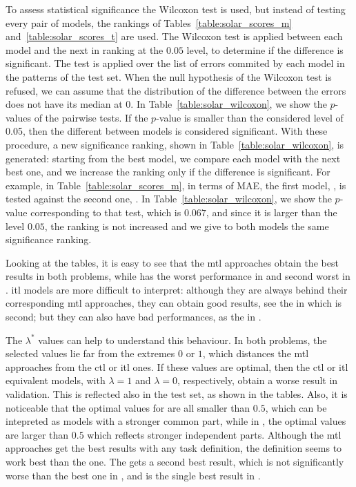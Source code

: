 To assess statistical significance the Wilcoxon test is used, but instead of testing every pair of models, the rankings of Tables~\ref{table:solar_scores_m} and~\ref{table:solar_scores_t} are used. The Wilcoxon test is applied between each model and the next in ranking at the $0.05$ level, to determine if the difference is significant.
The test is applied over the list of errors commited by each model in the patterns of the test set. When the null hypothesis of the Wilcoxon test is refused, we can assume that the distribution of the difference between the errors does not have its median at $0$.
In Table~\ref{table:solar_wilcoxon}, we show the $p$-values of the pairwise tests. If the $p$-value is smaller than the considered level of 0.05, then the different between models is considered significant.
%
With these procedure, a new significance ranking, shown in Table~\ref{table:solar_wilcoxon},  is generated: starting from the best model, we compare each model with the next best one, and we increase the ranking only if the difference is significant.
%
For example, in Table~\ref{table:solar_scores_m}, in terms of MAE, the first model, , is tested against the second one, . In Table~\ref{table:solar_wilcoxon}, we show the $p$-value corresponding to that test, which is $0.067$, and since it is larger than the level $0.05$, the ranking is not increased and we give to both models the same significance ranking. 

%
Looking at the tables, it is easy to see that the \acrshort{mtl} approaches obtain the best results in both problems, while  has the worst performance in  and second worst in .
\acrshort{itl} models are more difficult to interpret: although they are always behind their corresponding \acrshort{mtl} approaches, they can obtain good results, see the  in  which is second; but they can also have bad performances, as the  in .

%
The $\lambda^*$ values can help to understand this behaviour. In both problems, the selected values lie far from the extremes $0$ or $1$, which distances the \acrshort{mtl} approaches from the \acrshort{ctl} or \acrshort{itl} ones. If these values are optimal, then the \acrshort{ctl} or \acrshort{itl} equivalent models, with $\lambda=1$ and $\lambda=0$, respectively, obtain a worse result in validation. This is reflected also in the test set, as shown in the tables.
Also, it is noticeable that the optimal values for  are all smaller than $0.5$, which can be intepreted as models with a stronger common part, while in , the optimal values are larger than $0.5$ which reflects stronger independent parts.
%
Although the \acrshort{mtl} approaches get the best results with any task definition, the  definition seems to work best than the  one. The  gets a second best result, which is not significantly worse than the best one in , and is the single best result in .

